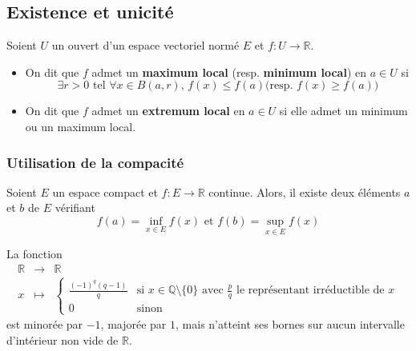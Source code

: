 




  \subsection{Existence et unicité}


  \begin{definition}
    Soient $U$ un ouvert d'un espace vectoriel normé $E$ et $f : U \rightarrow \mathbb{R}$.
    \begin{itemize}
      \item On dit que $f$ admet un \textbf{maximum local} (resp. \textbf{minimum local}) en $a \in U$ si
      \[ \exists r > 0 \text{ tel } \forall x \in B(a,r), \, f(x) \leq f(a) \text{(resp. } f(x) \geq f(a) \text{)} \]
      \item On dit que $f$ admet un \textbf{extremum local} en $a \in U$ si elle admet un minimum ou un maximum local.
    \end{itemize}
  \end{definition}

  \subsubsection{Utilisation de la compacité}


  \begin{theorem}
    Soient $E$ un espace compact et $f : E \rightarrow \mathbb{R}$ continue. Alors, il existe deux éléments $a$ et $b$ de $E$ vérifiant
    \[ f(a) = \inf_{x \in E} f(x) \text{ et } f(b) = \sup_{x \in E} f(x) \]
  \end{theorem}


  \begin{cexample}
    La fonction
    \[
    \begin{array}{ccc}
      \mathbb{R} &\rightarrow& \mathbb{R} \\
      x &\mapsto& \begin{cases}
        \frac{(-1)^q (q-1)}{q} &\text{si } x \in \mathbb{Q} \setminus \{ 0 \} \text{ avec } \frac{p}{q} \text{ le représentant irréductible de } x \\
        0 &\text{sinon}
      \end{cases}
    \end{array}
    \]
    est minorée par $-1$, majorée par $1$, mais n'atteint ses bornes sur aucun intervalle d'intérieur non vide de $\mathbb{R}$.
  \end{cexample}


